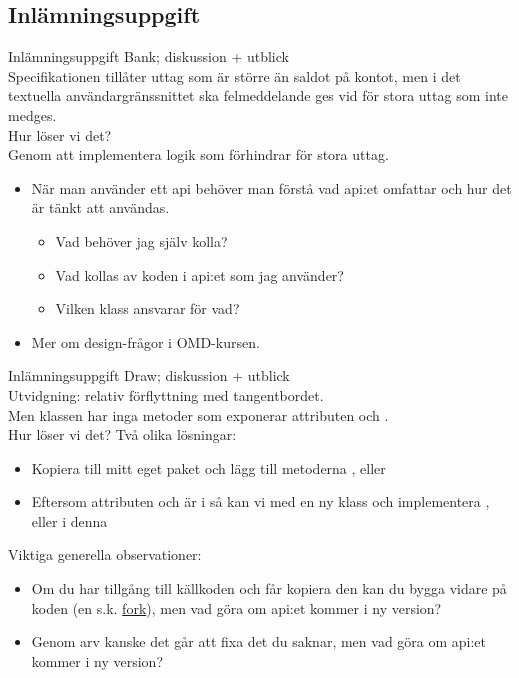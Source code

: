 \documentclass{lecturenotes}
\begin{document}
\subsection{Inlämningsuppgift}
\begin{Slide}{Inlämningsuppgift Bank; diskussion + utblick}
 \\
Specifikationen tillåter uttag som är större än saldot på kontot, men i det textuella användargränssnittet ska felmeddelande ges vid för stora uttag som inte medges. \\ 
\vspace {1em} Hur löser vi det? \\
\pause Genom att implementera logik som förhindrar för stora uttag.
 \\ \vspace {1em} 
 \pause
\begin{itemize}
\item När man använder ett api behöver man förstå vad api:et omfattar och hur det är tänkt att användas. 
\begin{itemize}
\item Vad behöver jag själv kolla? 
\item Vad kollas av koden i api:et som jag använder? 
\item Vilken klass ansvarar för vad?
\end{itemize}
\item Mer om design-frågor i OMD-kursen.
\end{itemize}
\end{Slide}

\begin{Slide}{Inlämningsuppgift Draw; diskussion + utblick}\footnotesize
{} \\
Utvidgning: relativ förflyttning med tangentbordet. \\Men klassen  har inga metoder som exponerar attributen  och .\\ 
\vspace {1em} Hur löser vi det? 
\pause Två olika lösningar:
\begin{itemize}\footnotesize
\item Kopiera   till mitt eget paket och lägg till metoderna ,  eller 
\item Eftersom attributen  och  är  i  så kan vi med en ny klass  och implementera ,  eller  i denna
\end{itemize}
 \pause \vspace{1em} Viktiga generella observationer:
\begin{itemize}\footnotesize
\item Om du har tillgång till källkoden och får kopiera den kan du bygga vidare på koden (en s.k. \href{https://sv.wikipedia.org/wiki/Fork}{fork}), men vad göra om api:et kommer i ny version? 
\item Genom arv kanske det går att fixa det du saknar, men vad göra om api:et kommer i ny version?
\end{itemize}
\end{Slide}
\end{document}
